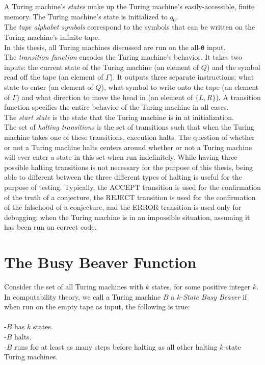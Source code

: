 \documentclass[11pt]{report}
\begin{document}
A Turing machine's \emph{states} make up the Turing machine's easily-accessible, finite memory. The Turing machine's state is initialized to $q_0$. \\

The \emph{tape alphabet symbols} correspond to the symbols that can be written on the Turing machine's infinite tape. \\

In this thesis, all Turing machines discussed are run on the all-\texttt{0} input. \\

The \emph{transition function} encodes the Turing machine's behavior. It takes two inputs: the current state of the Turing machine (an element of $Q$) and the symbol read off the tape (an element of $\Gamma$). It outputs three separate instructions: what state to enter (an element of $Q$), what symbol to write onto the tape (an element of $\Gamma$) and what direction to move the head in (an element of $\{L, R\}$). A transition function specifies the entire behavior of the Turing machine in all cases. \\

The \emph{start state} is the state that the Turing machine is in at initialization. \\

The set of \emph{halting transitions} is the set of transitions such that when the Turing machine takes one of these transitions, execution halts. The question of whether or not a Turing machine halts centers around whether or not a Turing machine will ever enter a state in this set when run indefinitely. While having three possible halting transitions is not necessary for the purpose of this thesis, being able to different between the three different types of halting is useful for the purpose of testing. Typically, the ACCEPT transition is used for the confirmation of the truth of a conjecture, the REJECT transition is used for the confirmation of the falsehood of a conjecture, and the ERROR transition is used only for debugging: when the Turing machine is in an impossible situation, assuming it has been run on correct code.

\section{The Busy Beaver Function}

Consider the set of all Turing machines with $k$ states, for some positive integer $k$. In computability theory, we call a Turing machine $B$ a $k$\emph{-State Busy Beaver} if when run on the empty tape as input, the following is true: \\ \\
-$B$ has $k$ states. \\
-$B$ halts. \\
-$B$ runs for at least as many steps before halting as all other halting $k$-state Turing machines. \cite{busybeaver} \\
\end{document}
